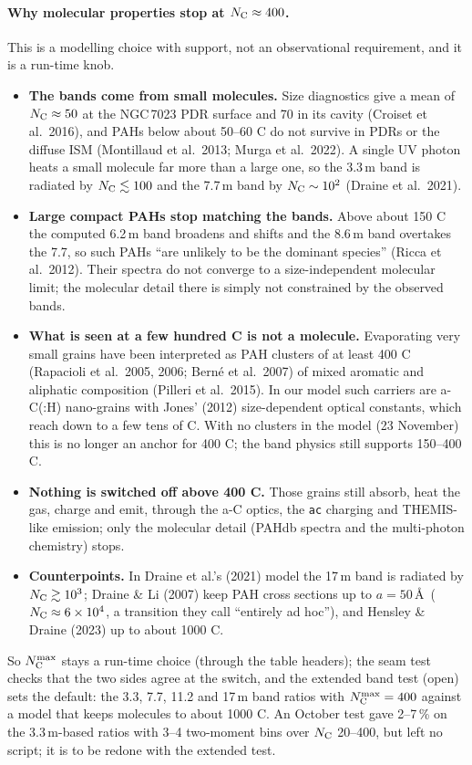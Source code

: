 \documentclass[11pt,a4paper]{article}
\newcommand{\NC}{N_{\rm C}}
\begin{document}
\paragraph{Why molecular properties stop at $\NC\approx400$.} This is a modelling choice with support, not an
observational requirement, and it is a run-time knob.
\begin{itemize}
\item \textbf{The bands come from small molecules.} Size diagnostics give a mean of $\NC\approx50$ at the NGC\,7023 PDR
  surface and 70 in its cavity (Croiset et al.\ 2016), and PAHs below about 50--60 C do not survive in PDRs or the
  diffuse ISM (Montillaud et al.\ 2013; Murga et al.\ 2022). A single UV photon heats a small molecule far more than a
  large one, so the 3.3\,\textmu m band is radiated by $\NC\lesssim100$ and the 7.7\,\textmu m band by $\NC\sim10^2$
  (Draine et al.\ 2021).
\item \textbf{Large compact PAHs stop matching the bands.} Above about 150 C the computed 6.2\,\textmu m band broadens
  and shifts and the 8.6\,\textmu m band overtakes the 7.7, so such PAHs ``are unlikely to be the dominant species''
  (Ricca et al.\ 2012). Their spectra do not converge to a size-independent molecular limit; the molecular detail
  there is simply not constrained by the observed bands.
\item \textbf{What is seen at a few hundred C is not a molecule.} Evaporating very small grains have been interpreted
  as PAH clusters of at least 400 C (Rapacioli et al.\ 2005, 2006; Bern\'e et al.\ 2007) of mixed aromatic and
  aliphatic composition (Pilleri et al.\ 2015). In our model such carriers are a-C(:H) nano-grains with Jones' (2012)
  size-dependent optical constants, which reach down to a few tens of C. With no clusters in the model (23 November)
  this is no longer an anchor for 400 C; the band physics still supports 150--400 C.
\item \textbf{Nothing is switched off above 400 C.} Those grains still absorb, heat the gas, charge and emit, through
  the a-C optics, the \texttt{ac} charging and THEMIS-like emission; only the molecular detail (PAHdb spectra and the
  multi-photon chemistry) stops.
\item \textbf{Counterpoints.} In Draine et al.'s (2021) model the 17\,\textmu m band is radiated by $\NC\gtrsim10^3$;
  Draine \& Li (2007) keep PAH cross sections up to $a = 50$\,\AA\ ($\NC\approx6\times10^4$, a transition they call
  ``entirely ad hoc''), and Hensley \& Draine (2023) up to about 1000 C.
\end{itemize}
So $\NC^{\max}$ stays a run-time choice (through the table headers); the seam test checks that the two sides agree at
the switch, and the extended band test (open) sets the default: the 3.3, 7.7, 11.2 and 17\,\textmu m band ratios with
$\NC^{\max} = 400$ against a model that keeps molecules to about 1000 C. An October test gave 2--7\,\% on the
3.3\,\textmu m-based ratios with 3--4 two-moment bins over $\NC$ 20--400, but left no script; it is to be redone with
the extended test.
\end{document}
